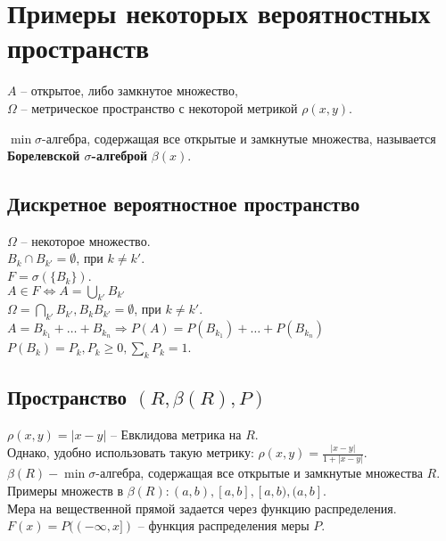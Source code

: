 \section{Примеры некоторых вероятностных пространств}

$A$ -- открытое, либо замкнутое множество,\\
$\Omega$ -- метрическое пространство с некоторой метрикой $\rho(x,y)$.

\begin{definition}
  $\min \sigma$-алгебра, содержащая все открытые и замкнутые множества, называется \textbf{Борелевской $\sigma$-алгеброй} $\beta(x)$.
\end{definition}

\subsection{Дискретное вероятностное пространство}

$\Omega$ -- некоторое множество.\\
$B_k\cap B_{k'}=\emptyset$, при $k\ne k'$.\\
$F=\sigma(\{B_k\})$.\\
$A\in F \Leftrightarrow A=\bigcup\limits_{k'} B_{k'}$\\
$\Omega = \bigcap\limits_{k'} B_{k'}, B_k B_{k'}=\emptyset$, при $k\ne k'$.\\
$A = B_{k_1}+…+B_{k_n} \Rightarrow P(A) = P(B_{k_1})+…+P(B_{k_n})$\\
$P(B_k)=P_k, P_k \geqslant 0, \sum\limits_k P_k =1$.

\subsection{Пространство $(R, \beta (R), P)$}

$\rho(x,y) = |x-y|$ -- Евклидова метрика на $R$.\\
Однако, удобно использовать такую метрику: $\rho(x,y)=\frac{|x-y|}{1+|x-y|}.$\\
$\beta (R) - \min \sigma$-алгебра, содержащая все открытые и замкнутые множества $R$.\\
Примеры множеств в $\beta (R): (a, b), [a, b], [a, b), (a, b]$.\\
Мера на вещественной прямой задается через функцию распределения.\\
$F(x)=P((-\infty, x])$ -- функция распределения меры $P$.

